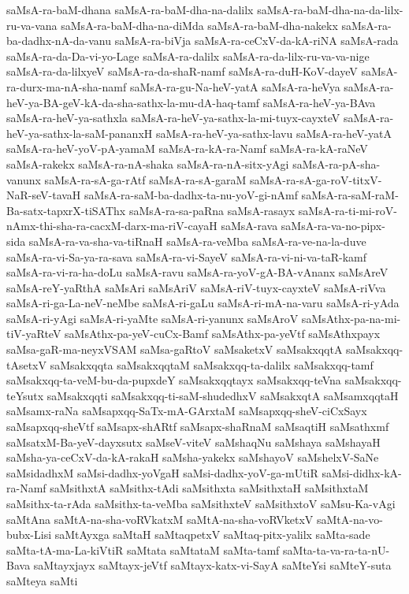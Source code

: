 {saMsA-ra-baM-dhana
saMsA-ra-baM-dha-na-dalilx
saMsA-ra-baM-dha-na-da-lilx-ru-va-vana
saMsA-ra-baM-dha-na-diMda
saMsA-ra-baM-dha-nakekx
saMsA-ra-ba-dadhx-nA-da-vanu
saMsA-ra-biVja
saMsA-ra-ceCxV-da-kA-riNA
saMsA-rada
saMsA-ra-da-Da-vi-yo-Lage
saMsA-ra-dalilx
saMsA-ra-da-lilx-ru-va-va-nige
saMsA-ra-da-lilxyeV
saMsA-ra-da-shaR-namf
saMsA-ra-duH-KoV-dayeV
saMsA-ra-durx-ma-nA-sha-namf
saMsA-ra-gu-Na-heV-yatA
saMsA-ra-heVya
saMsA-ra-heV-ya-BA-geV-kA-da-sha-sathx-la-mu-dA-haq-tamf
saMsA-ra-heV-ya-BAva
saMsA-ra-heV-ya-sathxla
saMsA-ra-heV-ya-sathx-la-mi-tuyx-cayxteV
saMsA-ra-heV-ya-sathx-la-saM-pananxH
saMsA-ra-heV-ya-sathx-lavu
saMsA-ra-heV-yatA
saMsA-ra-heV-yoV-pA-yamaM
saMsA-ra-kA-ra-Namf
saMsA-ra-kA-raNeV
saMsA-rakekx
saMsA-ra-nA-shaka
saMsA-ra-nA-sitx-yAgi
saMsA-ra-pA-sha-vanunx
saMsA-ra-sA-ga-rAtf
saMsA-ra-sA-garaM
saMsA-ra-sA-ga-roV-titxV-NaR-seV-tavaH
saMsA-ra-saM-ba-dadhx-ta-nu-yoV-gi-nAmf
saMsA-ra-saM-raM-Ba-satx-tapxrX-tiSAThx
saMsA-ra-sa-paRna
saMsA-rasayx
saMsA-ra-ti-mi-roV-nAmx-thi-sha-ra-cacxM-darx-ma-riV-cayaH
saMsA-rava
saMsA-ra-va-no-pipx-sida
saMsA-ra-va-sha-va-tiRnaH
saMsA-ra-veMba
saMsA-ra-ve-na-la-duve
saMsA-ra-vi-Sa-ya-ra-sava
saMsA-ra-vi-SayeV
saMsA-ra-vi-ni-va-taR-kamf
saMsA-ra-vi-ra-ha-doLu
saMsA-ravu
saMsA-ra-yoV-gA-BA-vAnanx
saMsAreV
saMsA-reY-yaRthA
saMsAri
saMsAriV
saMsA-riV-tuyx-cayxteV
saMsA-riVva
saMsA-ri-ga-La-neV-neMbe
saMsA-ri-gaLu
saMsA-ri-mA-na-varu
saMsA-ri-yAda
saMsA-ri-yAgi
saMsA-ri-yaMte
saMsA-ri-yanunx
saMsAroV
saMsAthx-pa-na-mi-tiV-yaRteV
saMsAthx-pa-yeV-cuCx-Bamf
saMsAthx-pa-yeVtf
saMsAthxpayx
saMsa-gaR-ma-neyxVSAM
saMsa-gaRtoV
saMsaketxV
saMsakxqqtA
saMsakxqq-tAsetxV
saMsakxqqta
saMsakxqqtaM
saMsakxqq-ta-dalilx
saMsakxqq-tamf
saMsakxqq-ta-veM-bu-da-pupxdeY
saMsakxqqtayx
saMsakxqq-teVna
saMsakxqq-teYsutx
saMsakxqqti
saMsakxqq-ti-saM-shudedhxV
saMsakxqtA
saMsamxqqtaH
saMsamx-raNa
saMsapxqq-SaTx-mA-GArxtaM
saMsapxqq-sheV-ciCxSayx
saMsapxqq-sheVtf
saMsapx-shARtf
saMsapx-shaRnaM
saMsaqtiH
saMsathxmf
saMsatxM-Ba-yeV-dayxsutx
saMseV-viteV
saMshaqNu
saMshaya
saMshayaH
saMsha-ya-ceCxV-da-kA-rakaH
saMsha-yakekx
saMshayoV
saMshelxV-SaNe
saMsidadhxM
saMsi-dadhx-yoVgaH
saMsi-dadhx-yoV-ga-mUtiR
saMsi-didhx-kA-ra-Namf
saMsithxtA
saMsithx-tAdi
saMsithxta
saMsithxtaH
saMsithxtaM
saMsithx-ta-rAda
saMsithx-ta-veMba
saMsithxteV
saMsithxtoV
saMsu-Ka-vAgi
saMtAna
saMtA-na-sha-voRVkatxM
saMtA-na-sha-voRVketxV
saMtA-na-vo-bubx-Lisi
saMtAyxga
saMtaH
saMtaqpetxV
saMtaq-pitx-yalilx
saMta-sade
saMta-tA-ma-La-kiVtiR
saMtata
saMtataM
saMta-tamf
saMta-ta-va-ra-ta-nU-Bava
saMtayxjayx
saMtayx-jeVtf
saMtayx-katx-vi-SayA
saMteYsi
saMteY-suta
saMteya
saMti
}

